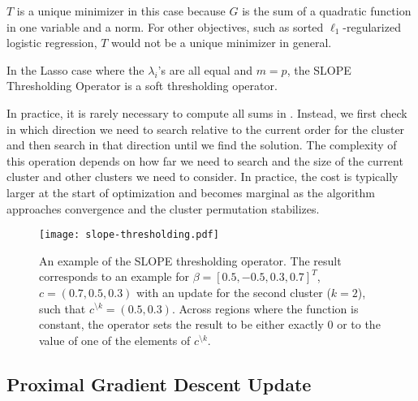 \begin{remark}
  \(T\) is a unique minimizer in this case because \(G\) is the sum of a quadratic function in one variable and a norm.
  For other objectives, such as sorted \(\ell_1\)-regularized logistic regression, \(T\) would not be a unique minimizer in general.
\end{remark}

\begin{remark}
  In the Lasso case where the $\lambda_i$'s are all equal and $m = p$, the SLOPE Thresholding Operator is a soft thresholding operator.
\end{remark}

In practice, it is rarely necessary to compute all sums in .
Instead, we first check in which direction we need to search relative to the current order for the cluster and then search in that direction until we find the solution.
The complexity of this operation depends on how far we need to search and the size of the current cluster and other clusters we need to consider.
In practice, the cost is typically larger at the start of optimization and becomes marginal as the algorithm approaches convergence and the cluster permutation stabilizes.


\begin{figure*}[htb]
  \centering
  \texttt{[image: slope-thresholding.pdf]}
  \caption{%
  An example of the SLOPE thresholding operator. The result corresponds to an
  example for \(\beta = [0.5, -0.5, 0.3, 0.7]^T\), \(c = (0.7, 0.5, 0.3)\)
  with an update for the second cluster (\(k = 2\)), such that
  \(c^{\setminus k} = (0.5, 0.3)\). Across regions where the function is constant,
      the operator sets the result to be either exactly 0 or to the value of one
      of the elements of \(c^{\setminus k}\).
    }
  \label{fig:slope-thresholding}
\end{figure*}

\subsection{Proximal Gradient Descent Update}
\label{sec:pgd-update}

